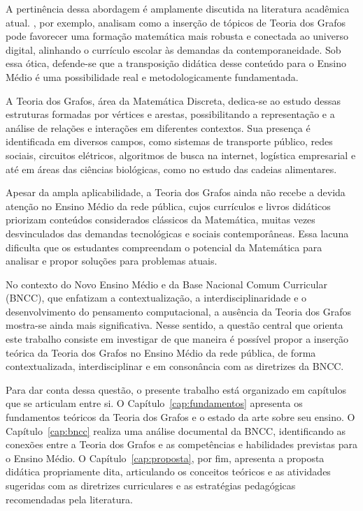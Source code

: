 \documentclass[
  12pt,
  oneside,
  a4paper,
  english,
  brazilian
  ]{abntex2}
\theoremstyle{definition}
\begin{document}
A pertinência dessa abordagem é amplamente discutida na literatura acadêmica
atual. , por exemplo, analisam como a inserção de
tópicos de Teoria dos Grafos pode favorecer uma formação matemática mais robusta
e conectada ao universo digital, alinhando o currículo escolar às demandas da
contemporaneidade. Sob essa ótica, defende-se que a transposição didática desse
conteúdo para o Ensino Médio é uma possibilidade real e metodologicamente
fundamentada.

A Teoria dos Grafos, área da Matemática Discreta, dedica-se ao estudo dessas
estruturas formadas por vértices e arestas, possibilitando a representação e a
análise de relações e interações em diferentes contextos. Sua presença é
identificada em diversos campos, como sistemas de transporte público, redes
sociais, circuitos elétricos, algoritmos de busca na internet, logística
empresarial e até em áreas das ciências biológicas, como no estudo das cadeias
alimentares.

Apesar da ampla aplicabilidade, a Teoria dos Grafos ainda não recebe a devida
atenção no Ensino Médio da rede pública, cujos currículos e livros didáticos
priorizam conteúdos considerados clássicos da Matemática, muitas vezes
desvinculados das demandas tecnológicas e sociais contemporâneas. Essa lacuna
dificulta que os estudantes compreendam o potencial da Matemática para analisar e
propor soluções para problemas atuais.

No contexto do Novo Ensino Médio e da Base Nacional Comum Curricular (BNCC), que
enfatizam a contextualização, a interdisciplinaridade e o desenvolvimento do
pensamento computacional, a ausência da Teoria dos Grafos mostra-se ainda mais
significativa. Nesse sentido, a questão central que orienta este trabalho consiste
em investigar de que maneira é possível propor a inserção teórica da Teoria dos
Grafos no Ensino Médio da rede pública, de forma contextualizada, interdisciplinar
e em consonância com as diretrizes da BNCC.

Para dar conta dessa questão, o presente trabalho está organizado em capítulos
que se articulam entre si. O Capítulo~\ref{cap:fundamentos} apresenta os
fundamentos teóricos da Teoria dos Grafos e o estado da arte sobre seu ensino.
O Capítulo~\ref{cap:bncc} realiza uma análise documental da BNCC, identificando
as conexões entre a Teoria dos Grafos e as competências e habilidades previstas
para o Ensino Médio. O Capítulo~\ref{cap:proposta}, por fim, apresenta a proposta
didática propriamente dita, articulando os conceitos teóricos e as atividades
sugeridas com as diretrizes curriculares e as estratégias pedagógicas
recomendadas pela literatura.
\end{document}
